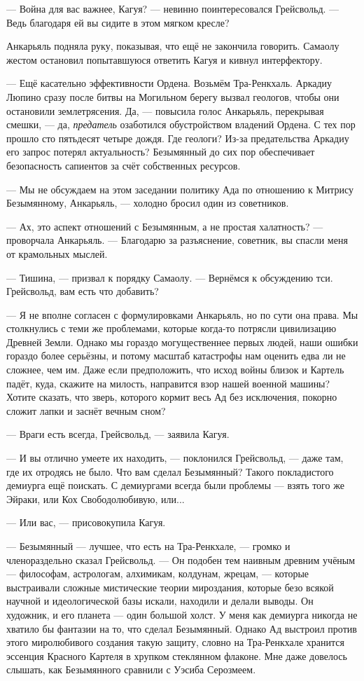--- Война для вас важнее, Кагуя? --- невинно поинтересовался Грейсвольд.
--- Ведь благодаря ей вы сидите в этом мягком кресле?

Анкарьяль подняла руку, показывая, что ещё не закончила говорить.
Самаолу жестом остановил попытавшуюся ответить Кагуя и кивнул интерфектору.

--- Ещё касательно эффективности Ордена.
Возьмём Тра-Ренкхаль.
Аркадиу Люпино сразу после битвы на Могильном берегу вызвал геологов, чтобы они остановили землетрясения.
Да, --- повысила голос Анкарьяль, перекрывая смешки, --- да, \emph{предатель} озаботился обустройством владений Ордена.
С тех пор прошло сто пятьдесят четыре дождя.
Где геологи?
Из-за предательства Аркадиу его запрос потерял актуальность?
Безымянный до сих пор обеспечивает безопасность сапиентов за счёт собственных ресурсов.

--- Мы не обсуждаем на этом заседании политику Ада по отношению к Митрису Безымянному, Анкарьяль, --- холодно бросил один из советников.

--- Ах, это аспект отношений с Безымянным, а не простая халатность? --- проворчала Анкарьяль.
--- Благодарю за разъяснение, советник, вы спасли меня от крамольных мыслей.

--- Тишина, --- призвал к порядку Самаолу.
--- Вернёмся к обсуждению тси.
Грейсвольд, вам есть что добавить?

--- Я не вполне согласен с формулировками Анкарьяль, но по сути она права.
Мы столкнулись с теми же проблемами, которые когда-то потрясли цивилизацию Древней Земли.
Однако мы гораздо могущественнее первых людей, наши ошибки гораздо более серьёзны, и потому масштаб катастрофы нам оценить едва ли не сложнее, чем им.
Даже если предположить, что исход войны близок и Картель падёт, куда, скажите на милость, направится взор нашей военной машины?
Хотите сказать, что зверь, которого кормит весь Ад без исключения, покорно сложит лапки и заснёт вечным сном?

--- Враги есть всегда, Грейсвольд, --- заявила Кагуя.

--- И вы отлично умеете их находить, --- поклонился Грейсвольд, --- даже там, где их отродясь не было.
Что вам сделал Безымянный?
Такого покладистого демиурга ещё поискать.
С демиургами всегда были проблемы --- взять того же Эйраки, или Кох Свободолюбивую, или...

--- Или вас, --- присовокупила Кагуя.

--- Безымянный --- лучшее, что есть на Тра-Ренкхале, --- громко и членораздельно сказал Грейсвольд.
--- Он подобен тем наивным древним учёным --- философам, астрологам, алхимикам, колдунам, жрецам, --- которые выстраивали сложные мистические теории мироздания, которые безо всякой научной и идеологической базы искали, находили и делали выводы.
Он художник, и его планета --- один большой холст.
У меня как демиурга никогда не хватило бы фантазии на то, что сделал Безымянный.
Однако Ад выстроил против этого миролюбивого создания такую защиту, словно на Тра-Ренкхале хранится эссенция Красного Картеля в хрупком стеклянном флаконе.
Мне даже довелось слышать, как Безымянного сравнили с Уэсиба Серозмеем.

